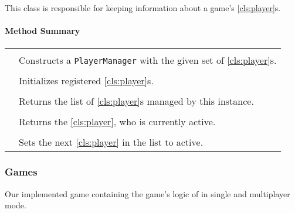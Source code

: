 \pagebreak

This class is responsible for keeping information about a game's \ref{cls:player}s.  \\

\centerdash

\paragraph*{Method Summary}
\paragraph*{}
\begin{longtable}{Lp{10cm}}
	\startmethodtable
	 \\
	& Constructs a \texttt{PlayerManager} with the given set of \ref{cls:player}s. \\
	 \\
	& Initializes registered \ref{cls:player}s. \\
	 \\
	& Returns the list of \ref{cls:player}s managed by this instance. \\
	 \\
	& Returns the \ref{cls:player}, who is currently active. \\
	 \\
	& Sets the next \ref{cls:player} in the list to active. \\
	\hline
\end{longtable}

\pagebreak

\subsubsection{Games}

Our implemented game containing the game's logic of \graphcoloring in single and multiplayer mode. \\

\centerdash

